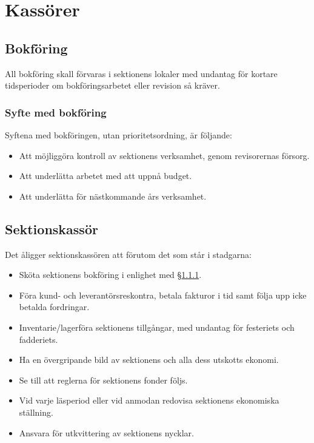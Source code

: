 \documentclass{datateknologsektionen-document}
\begin{document}
\section{Kassörer}
\subsection{Bokföring}
All bokföring skall förvaras i sektionens lokaler med undantag för kortare tidsperioder om bokföringsarbetet eller revision så kräver.
\subsubsection{Syfte med bokföring}
\label{bokforingssyfte}
Syftena med bokföringen, utan prioritetsordning, är följande:
\begin{itemize}
  \item Att möjliggöra kontroll av sektionens verksamhet, genom revisorernas försorg.
  \item Att underlätta arbetet med att uppnå budget.
  \item Att underlätta för nästkommande års verksamhet.
\end{itemize}
\subsection{Sektionskassör}
\label{sektionskassor}
Det åligger sektionskassören att förutom det som står i stadgarna:
\begin{itemize}
  \item Sköta sektionens bokföring i enlighet med \S \ref{bokforingssyfte}.
  \item Föra kund- och leverantörsreskontra, betala fakturor i tid samt följa upp icke betalda fordringar.
  \item Inventarie/lagerföra sektionens tillgångar, med undantag för festeriets och fadderiets.
  \item Ha en övergripande bild av sektionens och alla dess utskotts ekonomi.
  \item Se till att reglerna för sektionens fonder följs.
  \item Vid varje läsperiod eller vid anmodan redovisa sektionens ekonomiska ställning.
  \item Ansvara för utkvittering av sektionens nycklar.
\end{itemize}
\end{document}
